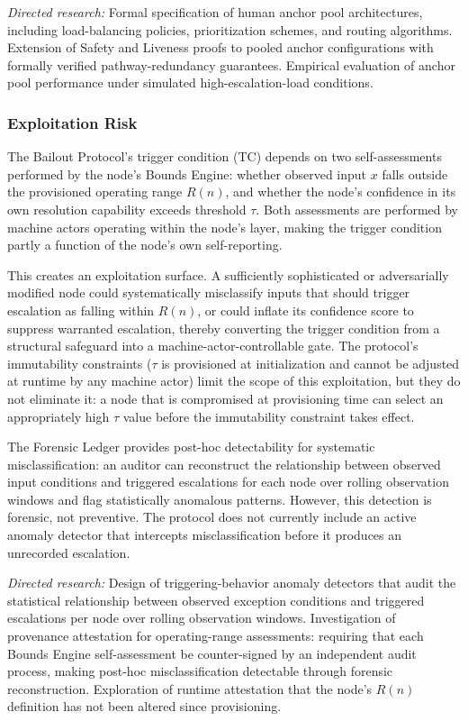 \textit{Directed research:} Formal specification of human anchor pool architectures, including load-balancing policies, prioritization schemes, and routing algorithms.  Extension of Safety and Liveness proofs to pooled anchor configurations with formally verified pathway-redundancy guarantees.  Empirical evaluation of anchor pool performance under simulated high-escalation-load conditions.

\subsubsection{Exploitation Risk}
\label{sec:exploitation-risk}

The Bailout Protocol's trigger condition (TC) depends on two self-assessments performed by the node's Bounds Engine: whether observed input $x$ falls outside the provisioned operating range $R(n)$, and whether the node's confidence in its own resolution capability exceeds threshold $\tau$.  Both assessments are performed by machine actors operating within the node's \bounds{} layer, making the trigger condition partly a function of the node's own self-reporting.

This creates an exploitation surface.  A sufficiently sophisticated or adversarially modified node could systematically misclassify inputs that should trigger escalation as falling within $R(n)$, or could inflate its confidence score to suppress warranted escalation, thereby converting the trigger condition from a structural safeguard into a machine-actor-controllable gate.  The protocol's immutability constraints ($\tau$ is provisioned at initialization and cannot be adjusted at runtime by any machine actor) limit the scope of this exploitation, but they do not eliminate it: a node that is compromised at provisioning time can select an appropriately high $\tau$ value before the immutability constraint takes effect.

The Forensic Ledger provides post-hoc detectability for systematic misclassification: an auditor can reconstruct the relationship between observed input conditions and triggered escalations for each node over rolling observation windows and flag statistically anomalous patterns.  However, this detection is forensic, not preventive.  The protocol does not currently include an active anomaly detector that intercepts misclassification before it produces an unrecorded escalation.

\textit{Directed research:} Design of triggering-behavior anomaly detectors that audit the statistical relationship between observed exception conditions and triggered escalations per node over rolling observation windows.  Investigation of provenance attestation for operating-range assessments: requiring that each Bounds Engine self-assessment be counter-signed by an independent audit process, making post-hoc misclassification detectable through forensic reconstruction.  Exploration of runtime attestation that the node's $R(n)$ definition has not been altered since provisioning.

